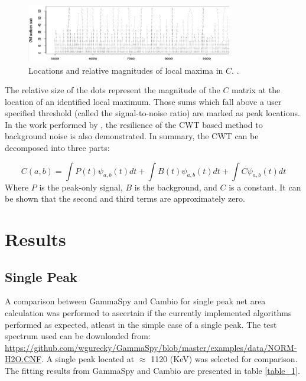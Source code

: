\documentclass[10pt]{article}
\begin{document}
\begin{figure}[!htbp]
\centering
\includegraphics[width=9cm]{images/cwt_dots.png}
\caption{Locations and relative magnitudes of local maxima in $C$. \cite{Du:2006}.}
\label{cwt_dots}
\end{figure}
The relative size of the dots represent the magnitude of the $C$ matrix at the location of an identified local maximum.
Those sums which fall above a user specified threshold (called the signal-to-noise ratio) are marked as peak locations. \\

In the work performed by \cite{Du:2006}, the resilience of the CWT based method to background noise is also demonstrated.
In summary, the CWT can be decomposed into three parts:

\begin{equation}
    C(a,b) = \int P(t)\psi_{a,b}(t) dt + \int B(t) \psi_{a,b}(t) dt + \int C \psi_{a,b} (t)dt
\end{equation}
Where $P$ is the peak-only signal, $B$ is the background, and $C$ is a constant.  It can be shown
that the second and third terms are approximately zero.


\section{Results}


\subsection{Single Peak}
A comparison between GammaSpy and Cambio for single peak net area calculation was performed
to ascertain if the currently implemented algorithms performed as expected, atleast in
the simple case of a single peak.
The test spectrum used can be downloaded from: \url{https://github.com/wgurecky/GammaSpy/blob/master/examples/data/NORM-H2O.CNF}.
A single peak located at $\approx$ 1120 (KeV) was selected for comparison.  The fitting results from
GammaSpy and Cambio are presented in table \ref{table_1}.
\end{document}
